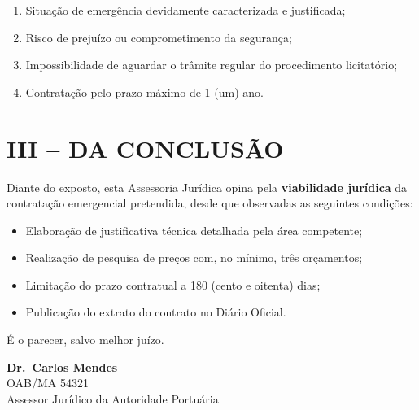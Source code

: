 \documentclass[12pt,a4paper]{article}
\begin{document}
\begin{enumerate}
  \item Situação de emergência devidamente caracterizada e justificada;
  \item Risco de prejuízo ou comprometimento da segurança;
  \item Impossibilidade de aguardar o trâmite regular do procedimento licitatório;
  \item Contratação pelo prazo máximo de 1 (um) ano.
\end{enumerate}

\section*{III -- DA CONCLUSÃO}

Diante do exposto, esta Assessoria Jurídica opina pela \textbf{viabilidade jurídica} da contratação emergencial pretendida, desde que observadas as seguintes condições:

\begin{itemize}
  \item Elaboração de justificativa técnica detalhada pela área competente;
  \item Realização de pesquisa de preços com, no mínimo, três orçamentos;
  \item Limitação do prazo contratual a 180 (cento e oitenta) dias;
  \item Publicação do extrato do contrato no Diário Oficial.
\end{itemize}

É o parecer, salvo melhor juízo.

\vspace{1.5cm}

\begin{center}
\textbf{Dr.\ Carlos Mendes}\\
OAB/MA 54321\\
Assessor Jurídico da Autoridade Portuária
\end{center}
\end{document}
